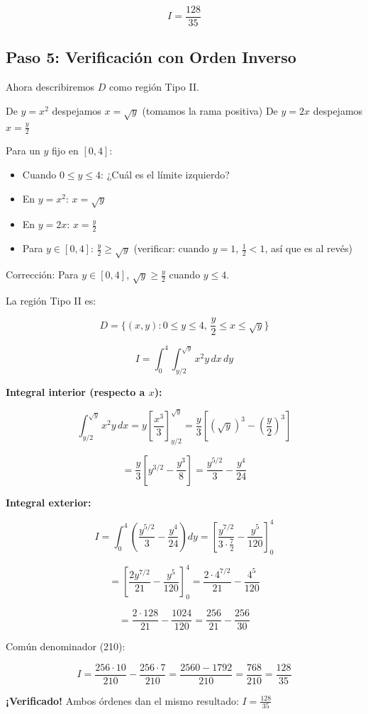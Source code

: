 \documentclass[12pt, a4paper]{book}
\begin{document}
\[
\boxed{I = \frac{128}{35}}
\]

\subsection{Paso 5: Verificación con Orden Inverso}

Ahora describiremos $D$ como región Tipo II.

De $y = x^2$ despejamos $x = \sqrt{y}$ (tomamos la rama positiva)
De $y = 2x$ despejamos $x = \frac{y}{2}$

Para un $y$ fijo en $[0,4]$:
\begin{itemize}
    \item Cuando $0 \leq y \leq 4$: ¿Cuál es el límite izquierdo?
    \item En $y = x^2$: $x = \sqrt{y}$
    \item En $y = 2x$: $x = \frac{y}{2}$
    \item Para $y \in [0,4]$: $\frac{y}{2} \geq \sqrt{y}$ (verificar: cuando $y = 1$, $\frac{1}{2} < 1$, así que es al revés)
\end{itemize}

Corrección: Para $y \in [0,4]$, $\sqrt{y} \geq \frac{y}{2}$ cuando $y \leq 4$.

La región Tipo II es:

\[
D = \{(x,y) : 0 \leq y \leq 4, \, \frac{y}{2} \leq x \leq \sqrt{y}\}
\]

\[
I = \int_0^4 \int_{y/2}^{\sqrt{y}} x^2 y \, dx \, dy
\]

\textbf{Integral interior (respecto a $x$):}

\[
\int_{y/2}^{\sqrt{y}} x^2 y \, dx = y \left[\frac{x^3}{3}\right]_{y/2}^{\sqrt{y}} = \frac{y}{3}\left[(\sqrt{y})^3 - \left(\frac{y}{2}\right)^3\right]
\]

\[
= \frac{y}{3}\left[y^{3/2} - \frac{y^3}{8}\right] = \frac{y^{5/2}}{3} - \frac{y^4}{24}
\]

\textbf{Integral exterior:}

\[
I = \int_0^4 \left(\frac{y^{5/2}}{3} - \frac{y^4}{24}\right) dy = \left[\frac{y^{7/2}}{3 \cdot \frac{7}{2}} - \frac{y^5}{120}\right]_0^4
\]

\[
= \left[\frac{2y^{7/2}}{21} - \frac{y^5}{120}\right]_0^4 = \frac{2 \cdot 4^{7/2}}{21} - \frac{4^5}{120}
\]

\[
= \frac{2 \cdot 128}{21} - \frac{1024}{120} = \frac{256}{21} - \frac{256}{30}
\]

Común denominador (210):

\[
I = \frac{256 \cdot 10}{210} - \frac{256 \cdot 7}{210} = \frac{2560 - 1792}{210} = \frac{768}{210} = \frac{128}{35}
\]

\textbf{¡Verificado!} Ambos órdenes dan el mismo resultado: $\boxed{I = \frac{128}{35}}$
\end{document}
